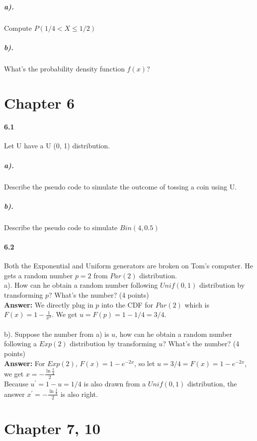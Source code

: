 \documentclass[11pt]{article} %
\begin{document}
\subparagraph*{a).} Compute $P(1/4 < X \leq 1/2)$
\subparagraph*{b).} What's the probability density function $f(x)$?

\section{Chapter 6}
\paragraph*{6.1} Let U have a U (0, 1) distribution.
\subparagraph*{a).} Describe the pseudo code to simulate the outcome of tossing a coin using U.
\subparagraph*{b).} Describe the pseudo code to simulate $Bin(4,0.5)$ 

\paragraph*{6.2}
Both the Exponential and Uniform generators are broken on Tom's computer. He gets a random number $p=2$ from $Par(2)$ distribution.\\
a). How can he obtain a random number following $Unif(0,1)$ distribution by transforming $p$? What's the number? (4 points)\\
\textbf{Answer:} We directly plug in $p$ into the CDF for $Par(2)$ which is $F(x) = 1- \frac{1}{x^2}$. We get $u = F(p) = 1 - 1/4 = 3/4$.\\
\\
b). Suppose the number from a) is $u$, how can he obtain a random number following a $Exp(2)$ distribution by transforming $u$? What's the number? (4 points)\\
\textbf{Answer:} For $Exp(2)$, $F(x) = 1 - e^{-2x}$, so let $u = 3/4 = F(x)= 1 - e^{-2x}$, we get $x = -\frac{\ln \frac{3}{4}}{2}$ \\
Because $u^\prime = 1 - u = 1/4$ is also drawn from a $Unif(0,1)$ distribution, the answer $x^\prime = -\frac{\ln\frac{1}{4}}{2}$ is also right.

\section{Chapter 7, 10}
\end{document}
